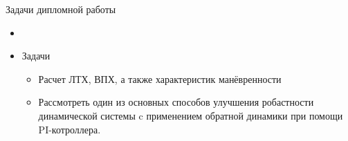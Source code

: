 \begin{frame}{Задачи дипломной работы}
\begin{itemize}
    \item  []
    \item  [] \begin{block}{Задачи}
        \begin{itemize}
        \item Расчет ЛТХ, ВПХ, а также характеристик манёвренности
        \item Рассмотреть один из основных способов улучшения робастности динамической 
        системы c применением обратной динамики при помощи PI-котроллера.
        \end{itemize}
    \end{block}
\end{itemize}    
\end{frame}